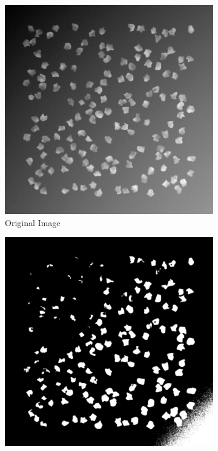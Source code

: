 \documentclass[%
	a4paper, %
	12pt, %
	english, %
	bibtotoc %
]{scrartcl}
\begin{document}
\begin{figure}[H]
    \centering
    \begin{subfigure}[b]{0.3\textwidth}
        \centering
        \includegraphics[width=\textwidth]{cells.png}
        \caption{Original Image}
        \label{fig:original_img}
    \end{subfigure}
    \hspace{1cm} %
    \begin{subfigure}[b]{0.3\textwidth}
        \centering
        \includegraphics[width=\textwidth]{cells_thresholding.jpg}

\end{subfigure}
\end{figure}
\end{document}
